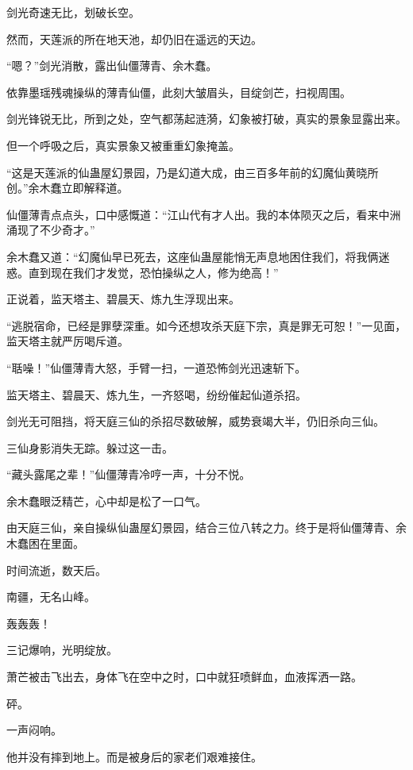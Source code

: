 
\begin{this_body}

剑光奇速无比，划破长空。

然而，天莲派的所在地天池，却仍旧在遥远的天边。

“嗯？”剑光消散，露出仙僵薄青、余木蠢。

依靠墨瑶残魂操纵的薄青仙僵，此刻大皱眉头，目绽剑芒，扫视周围。

剑光锋锐无比，所到之处，空气都荡起涟漪，幻象被打破，真实的景象显露出来。

但一个呼吸之后，真实景象又被重重幻象掩盖。

“这是天莲派的仙蛊屋幻景园，乃是幻道大成，由三百多年前的幻魔仙黄晓所创。”余木蠢立即解释道。

仙僵薄青点点头，口中感慨道：“江山代有才人出。我的本体陨灭之后，看来中洲涌现了不少奇才。”

余木蠢又道：“幻魔仙早已死去，这座仙蛊屋能悄无声息地困住我们，将我俩迷惑。直到现在我们才发觉，恐怕操纵之人，修为绝高！”

正说着，监天塔主、碧晨天、炼九生浮现出来。

“逃脱宿命，已经是罪孽深重。如今还想攻杀天庭下宗，真是罪无可恕！”一见面，监天塔主就严厉喝斥道。

“聒噪！”仙僵薄青大怒，手臂一扫，一道恐怖剑光迅速斩下。

监天塔主、碧晨天、炼九生，一齐怒喝，纷纷催起仙道杀招。

剑光无可阻挡，将天庭三仙的杀招尽数破解，威势衰竭大半，仍旧杀向三仙。

三仙身影消失无踪。躲过这一击。

“藏头露尾之辈！”仙僵薄青冷哼一声，十分不悦。

余木蠢眼泛精芒，心中却是松了一口气。

由天庭三仙，亲自操纵仙蛊屋幻景园，结合三位八转之力。终于是将仙僵薄青、余木蠢困在里面。

时间流逝，数天后。

南疆，无名山峰。

轰轰轰！

三记爆响，光明绽放。

萧芒被击飞出去，身体飞在空中之时，口中就狂喷鲜血，血液挥洒一路。

砰。

一声闷响。

他并没有摔到地上。而是被身后的家老们艰难接住。


\end{this_body}

